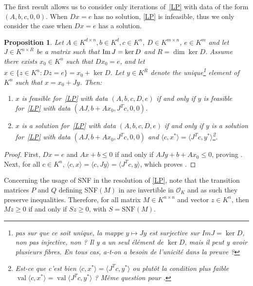 \documentclass[a4paper,12pt]{article}
\newtheorem{proposition}[theorem]{Proposition}
\newcommand{\allmat}{\mathbb{M}} %
\newcommand{\simone}[1]{{\color{blue} #1}} %
\DeclareMathOperator{\val}{val}
\newcommand{\OK}{\mathcal{O}_K}
\begin{document}
The first result allows us to consider only iterations of~\eqref{LP} with data of the
form $(A,b,c,0,0)$. When $Dx=e$ has no solution, \eqref{LP} is infeasible, thus
we only consider the case when $Dx=e$ has a solution.

\begin{proposition}\label{reducD}
  Let $A \in K^{d \times n}, b \in K^d, c\in K^n$, $D \in K^{m\times n}$,
  $e \in K^m$ and let $J \in K^{n \times R}$ be a matrix such that
  ${\rm Im}\, J = \ker D$ and $R = \dim \ker D$.
  Assume there exists $x_0 \in K^n$ such that $D x_0 = e$, and let
  $x \in \{z \in K^n : Dz = e\} = x_0 + \ker D$.
  Let $y \in K^R$ denote the unique\footnote{\simone{pas sur que ce soit unique,
    la mappe $y\mapsto Jy$ est surjective sur $Im J=\ker D$, non pas injective, non ?
    Il y a un seul élément de $\ker D$, mais il peut y avoir plusieurs fibres.
    En tous cas, a-t-on a besoin de l'unicité dans la preuve ?}}
  element of $K^n$ such that
  $x = x_0 + J y$. Then:
  \begin{enumerate}
  \item\label{reducD_item1}
    $x$ is feasible for~\eqref{LP} with data $(A,b,c,D,e)$ if and only if 
    $y$ is feasible for~\eqref{LP} with data $(AJ,b+A x_0,J^T c,0,0)$.
  \item\label{reducD_item2}
    $x$ is a solution for~\eqref{LP} with data $(A,b,c,D,e)$ if and only if 
    $y$ is a solution for~\eqref{LP} with data $(AJ,b+A x_0,J^T c,0,0)$ and
    $\langle c,x^* \rangle = \langle J^T c,y^* \rangle$\footnote{\simone{Est-ce que
    c'est bien $\langle c,x^* \rangle = \langle J^T c,y^* \rangle$ ou plutôt la condition
    plus faible $\val \langle c,x^* \rangle = \val \langle J^T c,y^* \rangle$ ?
  Même question pour \Cref{solsLP}.}}.
  \end{enumerate}
\end{proposition}

\begin{proof}
  First,  $Dx=e$ and $Ax + b \le 0$ if and only if $AJy + b+Ax_0 \le 0$, proving .
  Next, for all $c \in K^n$, $\langle c,x\rangle = \langle c, Jy\rangle = \langle J^T c,y\rangle$, which proves .
\end{proof}
 
Concerning the usage of SNF in the resolution of \eqref{LP}, note that the transition matrices $P$ and $Q$ defining SNF$(M)$ in  are invertible in $\OK$ and as such they preserve inequalities.
Therefore, for all matrix $M \in K^{n\times n}$ and vector $z \in K^n$,
then $Mz \geq 0$ if and only if $Sz \geq 0$, with $S = \mathrm{SNF}(M)$.
\end{document}
